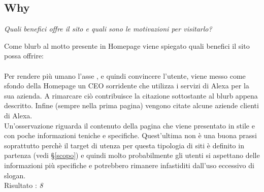 \subsection{Why}\label{why}
\begin{center}

\textit{Quali benefici offre il sito e quali sono le motivazioni per visitarlo?}

\end{center}
\begin{flushleft}
Come blurb al motto presente in Homepage viene spiegato quali benefici il sito 
possa offrire: \\
\\
Per rendere più umano l'asse , e quindi convincere l'utente,
viene messo come sfondo della Homepage un CEO sorridente che utilizza i servizi di Alexa
per la sua azienda. A rimarcare ciò contribuisce la citazione sottostante al 
blurb appena descritto. Infine (sempre nella prima pagina)
vengono citate alcune aziende clienti di Alexa. \\
Un'osservazione riguarda il contenuto della pagina
che viene presentato in stile  e con poche informazioni
teniche e specifiche. Quest'ultima non è una buona prassi soprattutto perchè il target di utenza
per questa tipologia di siti è definito in partenza (vedi §\ref{scopo}) e quindi
molto probabilmente gli utenti si aspettano delle informazioni più specifiche 
e potrebbero rimanere infastiditi dall'uso eccessivo di slogan. \\
Risultato : \textit{8}

\end{flushleft}